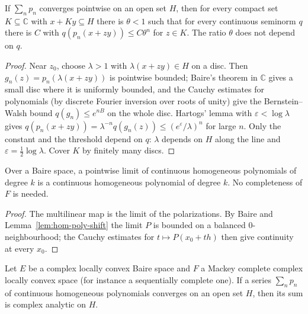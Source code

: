 \begin{proposition}
  \label{prop:bs-lines}
  \leanok
  If $\sum_n p_n$ converges pointwise on an open set $H$, then for every compact set
  $K \subseteq \mathbb{C}$ with $x + K y \subseteq H$ there is $\theta < 1$ such that for every
  continuous seminorm $q$ there is $C$ with $q(p_n(x + z y)) \le C \theta^n$ for $z \in K$. The
  ratio $\theta$ does not depend on $q$.
\end{proposition}

\begin{proof}
  \leanok
  Near $z_0$, choose $\lambda > 1$ with $\lambda(x + z y) \in H$ on a disc. Then
  $g_n(z) = p_n(\lambda(x + zy))$ is pointwise bounded; Baire's theorem in $\mathbb{C}$ gives a
  small disc where it is uniformly bounded, and the Cauchy estimates for polynomials (by discrete
  Fourier inversion over roots of unity) give the Bernstein--Walsh bound
  $q(g_n) \le e^{nB}$ on the whole disc. Hartogs' lemma with $\varepsilon < \log \lambda$ gives
  $q(p_n(x + zy)) = \lambda^{-n} q(g_n(z)) \le (e^{\varepsilon}/\lambda)^n$ for large $n$.
  Only the constant and the threshold depend on $q$: $\lambda$ depends on $H$ along the line and
  $\varepsilon = \tfrac12 \log \lambda$. Cover $K$ by finitely many discs.
\end{proof}

\begin{theorem}
  \label{thm:bs-limits}
  \leanok
  Over a Baire space, a pointwise limit of continuous homogeneous polynomials of degree $k$ is a
  continuous homogeneous polynomial of degree $k$. No completeness of $F$ is needed.
\end{theorem}

\begin{proof}
  \leanok
  The multilinear map is the limit of the polarizations. By Baire and
  Lemma~\ref{lem:hom-poly-shift} the limit $P$ is bounded on a balanced $0$-neighbourhood; the
  Cauchy estimates for $t \mapsto P(x_0 + t h)$ then give continuity at every $x_0$.
\end{proof}

\begin{theorem}
  \label{thm:bs-52}
  \leanok
  Let $E$ be a complex locally convex Baire space and $F$ a Mackey complete complex locally
  convex space (for instance a sequentially complete one). If a series $\sum_n p_n$ of continuous homogeneous polynomials converges on an
  open set $H$, then its sum is complex analytic on $H$.
\end{theorem}

